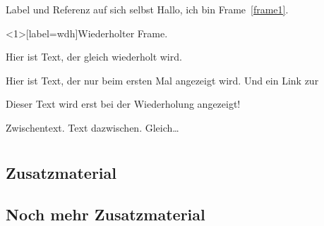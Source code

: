 	\begin{frame}[label=frame1]{Label und Referenz auf sich selbst}
		Hallo, ich bin Frame~\autoref{frame1}.
	\end{frame}

	\begin{frame}[label=wdh]{Wiederholter Frame.}

		Hier ist Text, der gleich wiederholt wird.

		\begin{overprint}
			Hier ist Text, der nur beim ersten Mal angezeigt wird.
			Und ein Link zur \hyperlink{wdh<2>}{}

			Dieser Text wird erst bei der Wiederholung angezeigt!
		\end{overprint}
	\end{frame}

	\begin{frame}{Zwischentext.}
		Text dazwischen. Gleich\dots
	\end{frame}









	\appendix

	\section{\appendixname}

	\frame{\tableofcontents}

	\subsection{Zusatzmaterial}


	\subsection{Noch mehr Zusatzmaterial}





